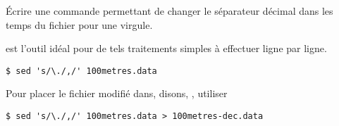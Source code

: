 \begin{exercice}
  Écrire une commande  permettant de changer le séparateur
  décimal dans les temps du fichier  pour une
  virgule.
  \begin{sol}
     est l'outil idéal pour de tels traitements simples à
    effectuer ligne par ligne.
    \begin{Schunk}
\begin{Verbatim}
$ sed 's/\./,/' 100metres.data
\end{Verbatim}
    \end{Schunk}
    Pour placer le fichier modifié dans, disons,
    , utiliser
    \begin{Schunk}
\begin{Verbatim}
$ sed 's/\./,/' 100metres.data > 100metres-dec.data
\end{Verbatim}
    \end{Schunk}
  \end{sol}
\end{exercice}

